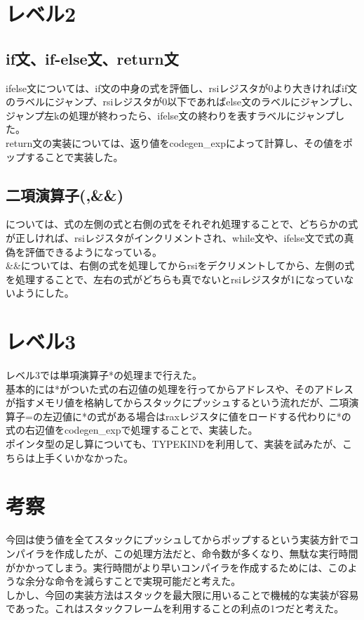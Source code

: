\documentclass[a4paper,11pt]{jsarticle}
\begin{document}
\section{レベル2}
\subsection{if文、if-else文、return文}
ifelse文については、if文の中身の式を評価し、rsiレジスタが0より大きければif文のラベルにジャンプ、rsiレジスタが0以下であればelse文のラベルにジャンプし、ジャンプ左kの処理が終わったら、ifelse文の終わりを表すラベルにジャンプした。 \\
\indent
return文の実装については、返り値をcodegen\_expによって計算し、その値をポップすることで実装した。
\subsection{二項演算子(\textbar\textbar,\&\&)}
\textbar\textbar については、式の左側の式と右側の式をそれぞれ処理することで、どちらかの式が正しければ、rsiレジスタがインクリメントされ、while文や、ifelse文で式の真偽を評価できるようになっている。\\
\indent
\&\&については、右側の式を処理してからrsiをデクリメントしてから、左側の式を処理することで、左右の式がどちらも真でないとrsiレジスタが1になっていないようにした。
\section{レベル3}
レベル3では単項演算子*の処理まで行えた。\\
\indent
基本的には*がついた式の右辺値の処理を行ってからアドレスや、そのアドレスが指すメモリ値を格納してからスタックにプッシュするという流れだが、二項演算子=の左辺値に*の式がある場合はraxレジスタに値をロードする代わりに*の式の右辺値をcodegen\_expで処理することで、実装した。\\
\indent
ポインタ型の足し算についても、TYPEKINDを利用して、実装を試みたが、こちらは上手くいかなかった。
\section{考察}
今回は使う値を全てスタックにプッシュしてからポップするという実装方針でコンパイラを作成したが、この処理方法だと、命令数が多くなり、無駄な実行時間がかかってしまう。実行時間がより早いコンパイラを作成するためには、このような余分な命令を減らすことで実現可能だと考えた。\\
\indent
しかし、今回の実装方法はスタックを最大限に用いることで機械的な実装が容易であった。これはスタックフレームを利用することの利点の1つだと考えた。
\end{document}
